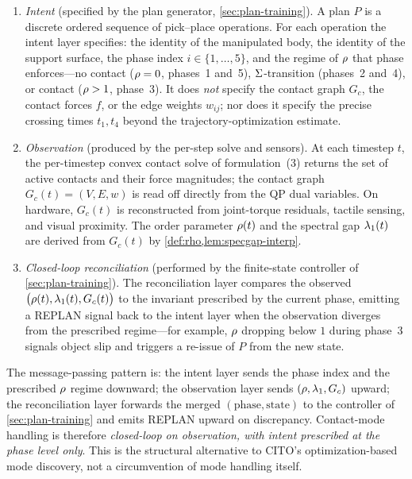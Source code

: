 \begin{enumerate}[leftmargin=*]
  \item \emph{Intent} (specified by the plan generator,
        \cref{sec:plan-training}). A plan $P$ is a discrete
        ordered sequence of pick--place operations. For each
        operation the intent layer specifies: the identity of
        the manipulated body, the identity of the support
        surface, the phase index $i \in \{1, \ldots, 5\}$, and
        the regime of $\rho$ that phase enforces---no
        contact ($\rho = 0$, phases~1 and~5),
        $\Sigma$-transition (phases~2 and~4), or contact
        ($\rho > 1$, phase~3). It does \emph{not} specify
        the contact graph $G_{c}$, the contact forces $f$, or
        the edge weights $w_{ij}$; nor does it specify the
        precise crossing times $t_{1}, t_{4}$ beyond the
        trajectory-optimization estimate.
  \item \emph{Observation} (produced by the per-step solve and
        sensors). At each timestep $t$, the per-timestep convex
        contact solve of formulation~(3) returns the set of
        active contacts and their force magnitudes; the contact
        graph $G_{c}(t) = (V, E, w)$ is read off directly from
        the QP dual variables. On hardware, $G_{c}(t)$ is
        reconstructed from joint-torque residuals, tactile
        sensing, and visual proximity. The order parameter
        $\rho(t)$ and the spectral gap $\lambda_{1}(t)$ are
        derived from $G_{c}(t)$ by
        \cref{def:rho,lem:specgap-interp}.
  \item \emph{Closed-loop reconciliation} (performed by the
        finite-state controller of \cref{sec:plan-training}).
        The reconciliation layer compares the observed
        $\bigl(\rho(t), \lambda_{1}(t), G_{c}(t)\bigr)$ to the
        invariant prescribed by the current phase, emitting a
        REPLAN signal back to the intent layer when the
        observation diverges from the prescribed regime---for
        example, $\rho$ dropping below $1$ during phase~3
        signals object slip and triggers a re-issue of $P$ from
        the new state.
\end{enumerate}

The message-passing pattern is: the intent layer sends the phase
index and the prescribed $\rho$ regime downward; the
observation layer sends $(\rho, \lambda_{1}, G_{c})$ upward;
the reconciliation layer forwards the merged $(\text{phase},
\text{state})$ to the controller of \cref{sec:plan-training} and
emits REPLAN upward on discrepancy. Contact-mode handling is
therefore \emph{closed-loop on observation, with intent
prescribed at the phase level only}. This is the structural
alternative to CITO's optimization-based mode discovery, not a
circumvention of mode handling itself.

